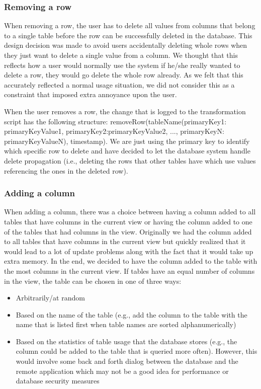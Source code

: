 \documentclass[12pt]{article}
\begin{document}
\subsubsection{Removing a row}
\label{sec:remove_row}
When removing a row, the user has to delete all values from columns that belong to a single table before the row can be successfully deleted in the database. This design decision was made to avoid users accidentally deleting whole rows when they just want to delete a single value from a column. We thought that this reflects how a user would normally use the system \textemdash if he/she really wanted to delete a row, they would go delete the whole row already. As we felt that this accurately reflected a normal usage situation, we did not consider this as a constraint that imposed extra annoyance upon the user.

When the user removes a row, the change that is logged to the transformation script has the following structure:
removeRow(tableName(primaryKey1:\\primaryKeyValue1, primaryKey2:primaryKeyValue2, ..., primaryKeyN:\\primaryKeyValueN), timestamp). We are just using the primary key to identify which specific row to delete and have decided to let the database system handle delete propagation (i.e., deleting the rows that other tables have which use values referencing the ones in the deleted row).

\subsubsection{Adding a column}
\label{sec:add_col}
When adding a column, there was a choice between having a column added to all tables that have columns in the current view or having the column added to one of the tables that had columns in the view. Originally we had the column added to all tables that have columns in the current view but quickly realized that it would lead to a lot of update problems along with the fact that it would take up extra memory. In the end, we decided to have the column added to the table with the most columns in the current view. If tables have an equal number of columns in the view, the table can be chosen in one of three ways:
\begin{itemize}
\item {Arbitrarily/at random}
\item{Based on the name of the table (e.g., add the column to the table with the name that is listed first when table names are sorted alphanumerically)}
\item{Based on the statistics of table usage that the database stores (e.g., the column could be added to the table that is queried more often). However, this would involve some back and forth dialog between the database and the remote application which may not be a good idea for performance or database security measures}
\end{itemize}
\end{document}

